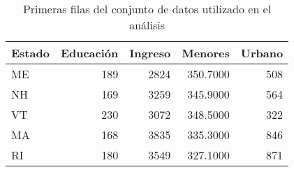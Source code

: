 \begin{table}
\caption{Primeras filas del conjunto de datos utilizado en el análisis}
\label{tab:head_datos}
\begin{tabular}{lrrrr}
\toprule
Estado & Educación & Ingreso & Menores & Urbano \\
\midrule
ME & 189 & 2824 & 350.7000 & 508 \\
NH & 169 & 3259 & 345.9000 & 564 \\
VT & 230 & 3072 & 348.5000 & 322 \\
MA & 168 & 3835 & 335.3000 & 846 \\
RI & 180 & 3549 & 327.1000 & 871 \\
\bottomrule
\end{tabular}
\end{table}
